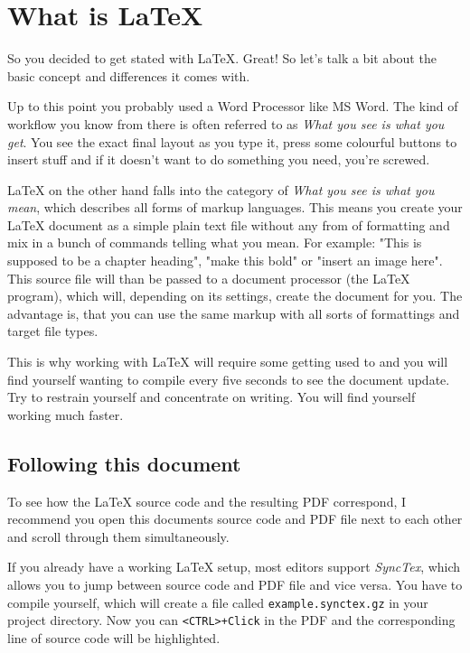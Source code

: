 \chapter{What is LaTeX} \label{chap: latex}
    So you decided to get stated with LaTeX. Great! So let's talk a bit about the basic concept and differences it comes with.

    \medskip
    Up to this point you probably used a Word Processor like MS Word. The kind of workflow you know from there is often referred to as \emph{What you
    see is what you get}. You see the exact final layout as you type it, press some colourful buttons to insert stuff and if it doesn't want to do
    something you need, you're screwed.

    LaTeX on the other hand falls into the category of \emph{What you see is what you mean}, which describes all forms of markup languages. This means
    you create your LaTeX document as a simple plain text file without any from of formatting and mix in a bunch of commands telling what you mean.
    For example: "This is supposed to be a chapter heading", "make this bold" or "insert an image here". This source file will than be passed to a
    document processor (the LaTeX program), which will, depending on its settings, create the document for you. The advantage is, that you can use the
    same markup with all sorts of formattings and target file types.

    This is why working with LaTeX will require some getting used to and you will find yourself wanting to compile every five seconds to see the
    document update. Try to restrain yourself and concentrate on writing. You will find yourself working much faster.

    \section{Following this document}
        To see how the LaTeX source code and the resulting PDF correspond, I recommend you open this documents source code and PDF file next to each
        other and scroll through them simultaneously.

        If you already have a working LaTeX setup, most editors support \emph{SyncTex}, which allows you to jump between source code and PDF file and
        vice versa. You have to compile yourself, which will create a file called \verb|example.synctex.gz| in your project directory. Now you
        can \verb|<CTRL>+Click| in the PDF and the corresponding line of source code will be highlighted.


